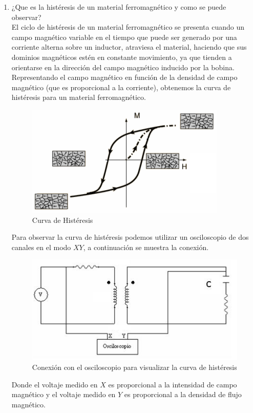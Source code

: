 \documentclass[twocolumn]{IEEEtran}
\begin{document}
\begin{enumerate}
 \item ¿Que es la histéresis de un material ferromagnético y como se puede observar?\\
El ciclo de histéresis de un material ferromagnético se presenta cuando un campo magnético variable en el tiempo que puede ser generado por una corriente alterna sobre un inductor,  atraviesa el material, haciendo que sus dominios magnéticos estén en constante movimiento, ya que tienden a orientarse en la dirección del campo magnético inducido por la bobina. Representando el campo magnético en función de la densidad de campo magnético (que es proporcional a la corriente), obtenemos la curva de histéresis para un material ferromagnético.
\begin{figure}[H]
	\centering
		\includegraphics[scale=0.5]{pre3a.png}
	\caption{Curva de Histéresis}
	\label{fig100}
\end{figure}
\noindent
Para observar la curva de histéresis podemos utilizar un osciloscopio de dos canales en el modo $XY$, a continuación se muestra la conexión.
\begin{figure}[H]
	\centering
		\includegraphics[scale=0.5]{pre3b.png}
	\caption{Conexión con el osciloscopio para visualizar la curva de histéresis}
	\label{fig101}
\end{figure}
\noindent
Donde  el voltaje  medido en $X$ es proporcional a la intensidad de campo magnético y el voltaje medido en $Y$ es proporcional a la densidad de flujo magnético.
\end{enumerate}
\end{document}
